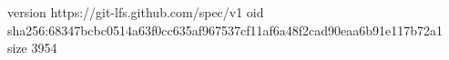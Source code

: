 version https://git-lfs.github.com/spec/v1
oid sha256:68347bcbc0514a63f0cc635af967537cf11af6a48f2cad90eaa6b91e117b72a1
size 3954
